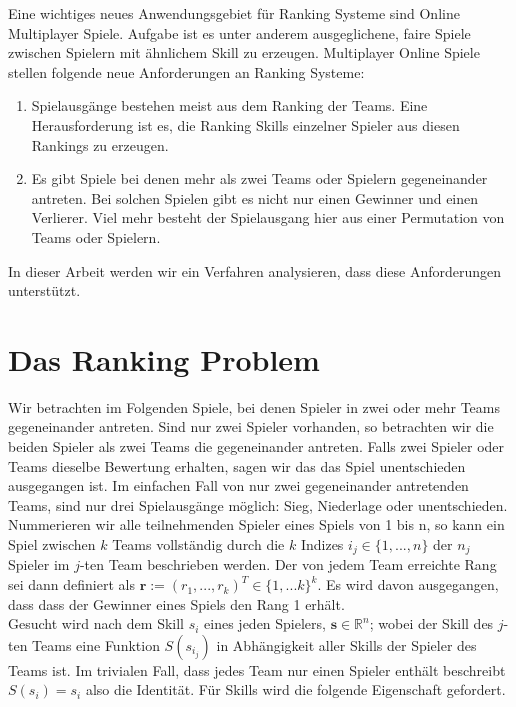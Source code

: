 \documentclass[12pt,a4paper]{scrartcl}
\numberwithin{equation}{section}
\newcommand{\R}{\mathbb{R}} %
\begin{document}
Eine wichtiges neues Anwendungsgebiet für Ranking Systeme sind Online Multiplayer Spiele. Aufgabe ist es unter anderem ausgeglichene, faire Spiele zwischen Spielern mit ähnlichem
Skill zu erzeugen. Multiplayer Online Spiele stellen folgende neue Anforderungen an Ranking Systeme:

\begin{enumerate}
 \item Spielausgänge bestehen meist aus dem Ranking der Teams. Eine Herausforderung ist es, die Ranking Skills einzelner Spieler aus diesen Rankings zu erzeugen.
 \item Es gibt Spiele bei denen mehr als zwei Teams oder Spielern gegeneinander antreten. Bei solchen Spielen gibt es nicht nur einen Gewinner und einen Verlierer. Viel mehr besteht der Spielausgang
 hier aus einer Permutation von Teams oder Spielern. 
\end{enumerate}

In dieser Arbeit werden wir ein Verfahren analysieren, dass diese Anforderungen unterstützt.
 \newpage  %
\section{Das Ranking Problem}

Wir betrachten im Folgenden Spiele, bei denen Spieler in zwei oder mehr Teams gegeneinander antreten. Sind nur zwei Spieler vorhanden, so betrachten wir die beiden Spieler als zwei Teams
die gegeneinander antreten. Falls zwei Spieler oder Teams dieselbe Bewertung erhalten, sagen wir das das Spiel unentschieden ausgegangen ist. 
Im einfachen Fall von nur zwei gegeneinander antretenden Teams, sind nur drei Spielausgänge möglich: Sieg, Niederlage oder unentschieden. \\
Nummerieren wir alle teilnehmenden Spieler eines Spiels von 1 bis n, so kann ein Spiel zwischen $k$ Teams vollständig durch die $k$ Indizes $i_{j} \in \{ 1,...,n \} $ der $n_{j}$ Spieler
im $j$-ten Team beschrieben werden. Der von jedem Team erreichte Rang sei dann definiert als $\textbf{r}:= (r_{1},...,r_{k})^T \in \{ 1,...k \}^{k}$. Es wird davon ausgegangen, dass
dass der Gewinner eines Spiels den Rang 1 erhält. \\
Gesucht wird nach dem Skill $s_{i}$ eines jeden Spielers, $\textbf{s} \in \R^{n}$; wobei der Skill des $j$-ten Teams eine Funktion $S(s_{i_j})$ in Abhängigkeit aller Skills
der Spieler des Teams ist. Im trivialen Fall, dass jedes Team nur einen Spieler enthält beschreibt $S(s_{i}) = s_{i}$ also die Identität.
Für Skills wird die folgende Eigenschaft gefordert. 
\end{document}
